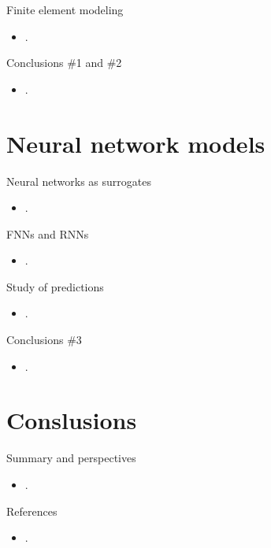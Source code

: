 \documentclass[aspectratio=169,11pt]{beamer}
\begin{document}
\begin{frame}{Finite element modeling}
\begin{itemize}
	\item .
\end{itemize}
\end{frame}

\begin{frame}{Conclusions \#1 and \#2}
\begin{itemize}
	\item .
\end{itemize}
\end{frame}

\section{Neural network models}
\begin{frame}{Neural networks as surrogates}
\begin{itemize}
	\item .
\end{itemize}
\end{frame}

\begin{frame}{FNNs and RNNs}
\begin{itemize}
	\item .
\end{itemize}
\end{frame}

\begin{frame}{Study of predictions}
\begin{itemize}
	\item .
\end{itemize}
\end{frame}

\begin{frame}{Conclusions \#3}
\begin{itemize}
	\item .
\end{itemize}
\end{frame}

\section{Conslusions}
\begin{frame}{Summary and perspectives}
\begin{itemize}
	\item .
\end{itemize}
\end{frame}

\begin{frame}{References}
\begin{itemize}
	\item .
\end{itemize}
\end{frame}
\end{document}
